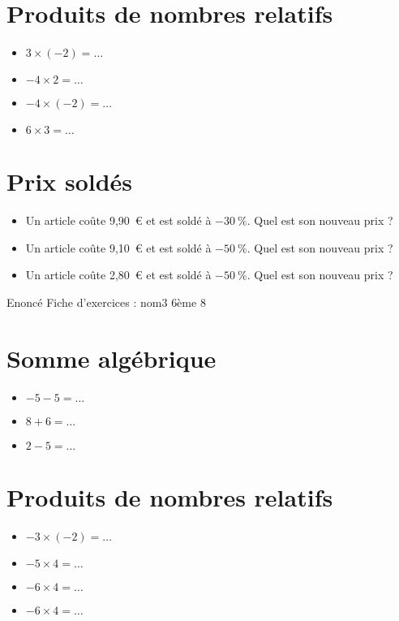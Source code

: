 \documentclass[a4paper,11pt,fleqn]{article}
\begin{document}
\section{Produits de nombres relatifs}
\begin{itemize}

  \item $3\times(-2)=\ldots$
  \item $-4\times2=\ldots$
  \item $-4\times(-2)=\ldots$
  \item $6\times3=\ldots$
\end{itemize}


\section{Prix soldés}
\begin{itemize}

  \item Un article coûte 9,90~€ et est soldé à $-30~\%$. Quel est son nouveau prix ?
  \item Un article coûte 9,10~€ et est soldé à $-50~\%$. Quel est son nouveau prix ?
  \item Un article coûte 2,80~€ et est soldé à $-50~\%$. Quel est son nouveau prix ?
\end{itemize}
\newpage
\setcounter{exo}{0}
\setcounter{section}{0}
{Enoncé} \hfill {\huge Fiche d'exercices  : nom3} \hfill {6ème 8}

\section{Somme algébrique}
\begin{itemize}

  \item $-5 -5=\ldots$
  \item $8 +6=\ldots$
  \item $2 -5=\ldots$
\end{itemize}


\section{Produits de nombres relatifs}
\begin{itemize}

  \item $-3\times(-2)=\ldots$
  \item $-5\times4=\ldots$
  \item $-6\times4=\ldots$
  \item $-6\times4=\ldots$
\end{itemize}
\end{document}
